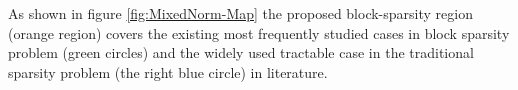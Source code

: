 \begin{remark}
As shown in figure \ref{fig:MixedNorm-Map} the proposed block-sparsity region (orange region) covers the existing most frequently studied cases in block sparsity problem (green circles) and the widely used tractable case in the traditional sparsity problem (the right blue circle) in literature.
\end{remark}